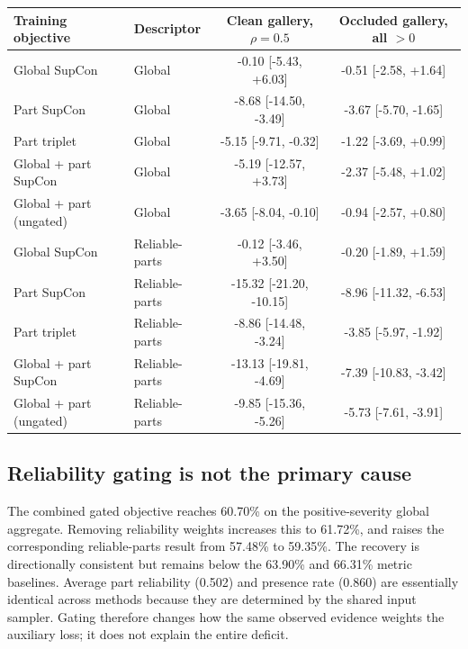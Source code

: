 \documentclass[runningheads]{llncs}
\begin{document}
\begin{table}[!t]
\begin{tabularx}{\textwidth}{@{}>{\raggedright\arraybackslash}Xlcc@{}}
\toprule
Training objective & Descriptor & \shortstack{Clean gallery,\\$\rho=0.5$} &
\shortstack{Occluded gallery,\\all $>0$} \\
\midrule
Global SupCon & Global & -0.10 [-5.43, +6.03] & -0.51 [-2.58, +1.64] \\
Part SupCon & Global & -8.68 [-14.50, -3.49] & -3.67 [-5.70, -1.65] \\
Part triplet & Global & -5.15 [-9.71, -0.32] & -1.22 [-3.69, +0.99] \\
Global + part SupCon & Global & -5.19 [-12.57, +3.73] & -2.37 [-5.48, +1.02] \\
Global + part (ungated) & Global & -3.65 [-8.04, -0.10] & -0.94 [-2.57, +0.80] \\
Global SupCon & Reliable-parts & -0.12 [-3.46, +3.50] & -0.20 [-1.89, +1.59] \\
Part SupCon & Reliable-parts & -15.32 [-21.20, -10.15] & -8.96 [-11.32, -6.53] \\
Part triplet & Reliable-parts & -8.86 [-14.48, -3.24] & -3.85 [-5.97, -1.92] \\
Global + part SupCon & Reliable-parts & -13.13 [-19.81, -4.69] & -7.39 [-10.83, -3.42] \\
Global + part (ungated) & Reliable-parts & -9.85 [-15.36, -5.26] & -5.73 [-7.61, -3.91] \\
\bottomrule
\end{tabularx}
\end{table}

\subsection{Reliability gating is not the primary cause}

The combined gated objective reaches 60.70\% on the positive-severity global
aggregate. Removing reliability weights increases this to 61.72\%, and raises
the corresponding reliable-parts result from 57.48\% to 59.35\%. The recovery
is directionally consistent but remains below the 63.90\% and 66.31\% metric
baselines. Average part reliability (0.502) and presence rate (0.860) are
essentially identical across methods because they are determined by the shared
input sampler. Gating therefore changes how the same observed evidence weights
the auxiliary loss; it does not explain the entire deficit.
\end{document}
